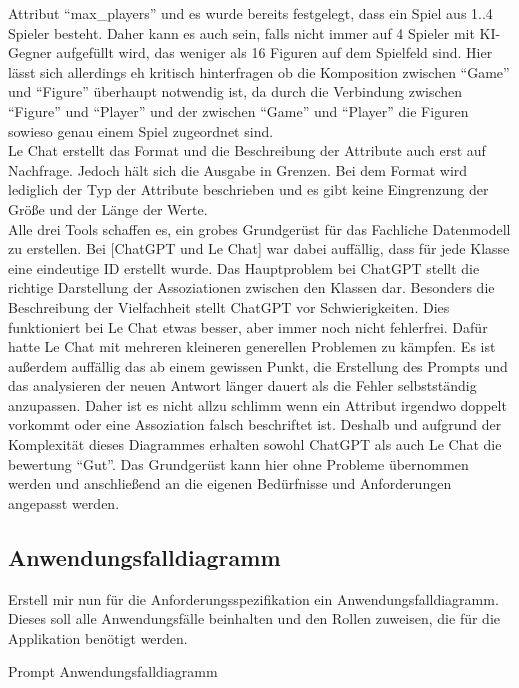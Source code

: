 Attribut ``max\_players'' und es wurde bereits festgelegt, dass ein Spiel aus 1..4 Spieler besteht. Daher kann es auch sein, falls nicht immer auf 4 Spieler mit KI-Gegner aufgefüllt 
wird, das weniger als 16 Figuren auf dem Spielfeld sind. Hier lässt sich allerdings eh kritisch hinterfragen ob die Komposition zwischen ``Game'' und ``Figure'' überhaupt 
notwendig ist, da durch die Verbindung zwischen ``Figure'' und ``Player'' und der zwischen ``Game'' und ``Player'' die Figuren sowieso genau einem Spiel zugeordnet sind.\\
Le Chat erstellt das Format und die Beschreibung der Attribute auch erst auf Nachfrage. Jedoch hält sich die Ausgabe in Grenzen. Bei dem Format wird lediglich der Typ der
Attribute beschrieben und es gibt keine Eingrenzung der Größe und der Länge der Werte.\\

Alle drei Tools schaffen es, ein grobes Grundgerüst für das Fachliche Datenmodell zu erstellen. Bei [ChatGPT und Le Chat] war dabei auffällig, dass für jede Klasse eine 
eindeutige ID erstellt wurde. Das Hauptproblem bei ChatGPT stellt die richtige Darstellung der Assoziationen zwischen den Klassen dar. Besonders die Beschreibung der 
Vielfachheit stellt ChatGPT vor Schwierigkeiten. Dies funktioniert bei Le Chat etwas besser, aber immer noch nicht fehlerfrei. Dafür hatte Le Chat mit mehreren kleineren 
generellen Problemen zu kämpfen. Es ist außerdem auffällig das ab einem gewissen Punkt, die Erstellung des Prompts und das analysieren der neuen Antwort länger dauert als 
die Fehler selbstständig anzupassen. Daher ist es nicht allzu schlimm wenn ein Attribut irgendwo doppelt vorkommt oder eine Assoziation falsch beschriftet ist. Deshalb und
aufgrund der Komplexität dieses Diagrammes erhalten sowohl ChatGPT als auch Le Chat die bewertung ``Gut''. Das Grundgerüst kann hier ohne Probleme übernommen werden und 
anschließend an die eigenen Bedürfnisse und Anforderungen angepasst werden. 


\subsection*{Anwendungsfalldiagramm}

\begin{prompt}[H]
    \begin{tcolorbox}[colback=gray!20, colframe=gray!20, boxrule=0pt, sharp corners] 
        Erstell mir nun für die Anforderungsspezifikation ein Anwendungsfalldiagramm. Dieses soll alle Anwendungsfälle beinhalten und den Rollen zuweisen, die für die 
        Applikation benötigt werden.
        \vfill
    \end{tcolorbox}
    \caption{Prompt Anwendungsfalldiagramm}
    \label{Prompt Anwendungsfalldiagramm}
\end{prompt}

